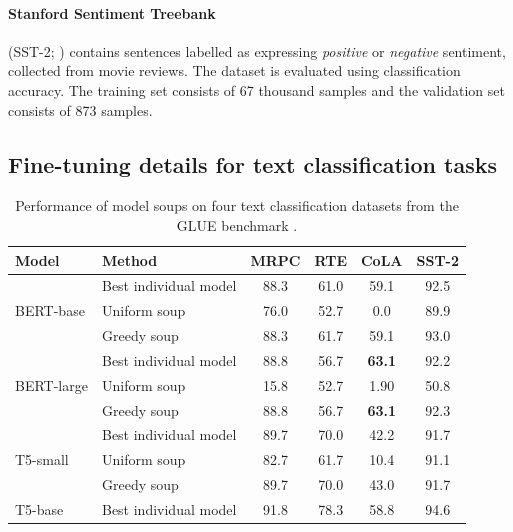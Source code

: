 \documentclass[nohyperref]{article}
\theoremstyle{plain}
\theoremstyle{definition}
\theoremstyle{remark}
\begin{document}
    \paragraph{Stanford Sentiment Treebank} (SST-2; \cite{socher2013recursive}) contains sentences labelled as expressing \textit{positive} or \textit{negative} sentiment, collected from movie reviews. The dataset is evaluated using classification accuracy. The training set consists of 67 thousand samples and the validation set consists of 873 samples.
    \subsection{Fine-tuning details for text classification tasks}
    \label{app:nlp_ft}
    
    
        \begin{table}
            \caption{Performance of model soups on four text classification datasets from the GLUE benchmark \cite{wang2018glue}.}
            \begin{center}\small
            \setlength{\arrayrulewidth}{.01em}
            \setlength{\tabcolsep}{12pt}
            \begin{tabular}{llcccc}
                \toprule
                Model & Method & MRPC & RTE & CoLA & SST-2  \\\midrule
                \multirow{3}{*}{BERT-base \cite{devlin2019bert}} & Best individual model & 88.3 & 61.0 & 59.1 & 92.5 \\
                & Uniform soup & 76.0 & 52.7 & 0.0 & 89.9 \\
                & Greedy soup & 88.3 & 61.7 & 59.1 & 93.0 \\\midrule
                \multirow{3}{*}{BERT-large \cite{devlin2019bert}}& Best individual model & 88.8 & 56.7 & \textbf{63.1} & 92.2 \\
                & Uniform soup & 15.8 & 52.7 & 1.90 & 50.8 \\
                &  Greedy soup & 88.8 & 56.7 & \textbf{63.1} & 92.3 \\\midrule
                \multirow{3}{*}{T5-small \cite{raffel2020t5}} & Best individual model & 89.7 & 70.0 & 42.2 & 91.7 \\
                &  Uniform soup & 82.7 & 61.7 & 10.4 & 91.1 \\
                &  Greedy soup & 89.7 & 70.0 & 43.0 & 91.7 \\\midrule
                \multirow{3}{*}{T5-base \cite{raffel2020t5}} & Best individual model & 91.8 & 78.3 & 58.8 & 94.6\\

\end{tabular}
\end{center}
\end{table}
\end{document}
